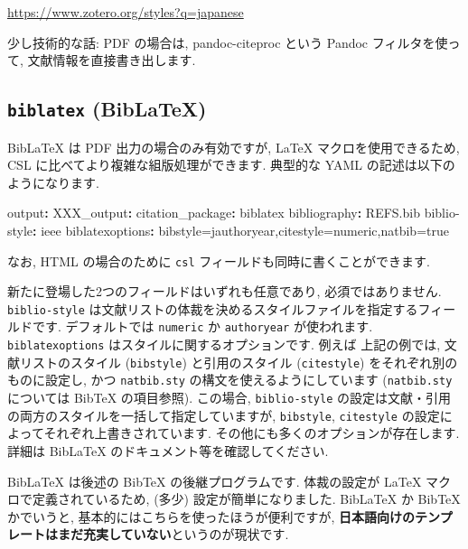 \documentclass[
]{ltjsarticle}
\newenvironment{Shaded}{\begin{snugshade}}{\end{snugshade}}
\newcommand{\AttributeTok}[1]{\textcolor[rgb]{0.77,0.63,0.00}{#1}}
\newcommand{\FunctionTok}[1]{\textcolor[rgb]{0.00,0.00,0.00}{#1}}
\newcommand{\KeywordTok}[1]{\textcolor[rgb]{0.13,0.29,0.53}{\textbf{#1}}}
\begin{document}
\url{https://www.zotero.org/styles?q=japanese}

少し技術的な話: PDF の場合は, pandoc-citeproc という Pandoc フィルタを使って, 文献情報を直接書き出します.

\hypertarget{biblatex-biblatex}{%
\subsection{\texorpdfstring{\texttt{biblatex} (BibLaTeX)}{biblatex (BibLaTeX)}}\label{biblatex-biblatex}}

BibLaTeX は PDF 出力の場合のみ有効ですが, LaTeX マクロを使用できるため, CSL に比べてより複雑な組版処理ができます. 典型的な YAML の記述は以下のようになります.

\begin{Shaded}
\begin{Highlighting}[]
\FunctionTok{output}\KeywordTok{:}
\AttributeTok{    }\FunctionTok{XXX\_output}\KeywordTok{:}
\AttributeTok{      }\FunctionTok{citation\_package}\KeywordTok{:}\AttributeTok{ biblatex}
\FunctionTok{bibliography}\KeywordTok{:}\AttributeTok{ REFS.bib}
\FunctionTok{biblio{-}style}\KeywordTok{:}\AttributeTok{ ieee}
\FunctionTok{biblatexoptions}\KeywordTok{:}\AttributeTok{ bibstyle=jauthoryear,citestyle=numeric,natbib=true}
\end{Highlighting}
\end{Shaded}

なお, HTML の場合のために \texttt{csl} フィールドも同時に書くことができます.

新たに登場した2つのフィールドはいずれも任意であり, 必須ではありません. \texttt{biblio-style} は文献リストの体裁を決めるスタイルファイルを指定するフィールドです. デフォルトでは \texttt{numeric} か \texttt{authoryear} が使われます. \texttt{biblatexoptions} はスタイルに関するオプションです. 例えば 上記の例では, 文献リストのスタイル (\texttt{bibstyle}) と引用のスタイル (\texttt{citestyle}) をそれぞれ別のものに設定し, かつ \texttt{natbib.sty} の構文を使えるようにしています (\texttt{natbib.sty} については BibTeX の項目参照). この場合, \texttt{biblio-style} の設定は文献・引用の両方のスタイルを一括して指定していますが, \texttt{bibstyle}, \texttt{citestyle} の設定によってそれぞれ上書きされています. その他にも多くのオプションが存在します. 詳細は BibLaTeX のドキュメント等を確認してください.

BibLaTeX は後述の BibTeX の後継プログラムです. 体裁の設定が LaTeX マクロで定義されているため, (多少) 設定が簡単になりました. BibLaTeX か BibTeX かでいうと, 基本的にはこちらを使ったほうが便利ですが, \textbf{日本語向けのテンプレートはまだ充実していない}というのが現状です.
\end{document}
